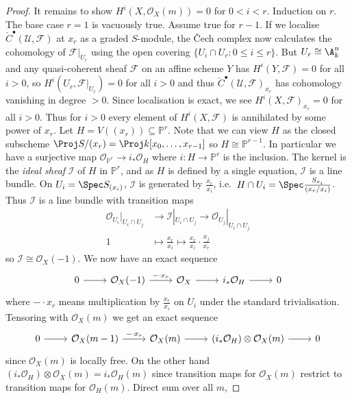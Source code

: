 \documentclass[a4paper]{article}
\renewcommand*{\P}{\mathbb{P}}
\newcommand{\sh}[1]{\mathcal{#1}} %
\begin{document}
\begin{proof}
  It remains to show \(H^i(X, \sh O_X(m)) = 0\) for \(0 < i < r\). Induction on \(r\). The base case \(r = 1\) is vacuously true. Assume true for \(r - 1\). If we localise \(\check C^\bullet(\mathcal U, \sh F)\) at \(x_r\) as a graded \(S\)-module, the Čech complex now calculates the cohomology of \(\sh F|_{U_r}\) using the open covering \(\{U_i \cap U_r: 0 \leq i \leq r\}\). But \(U_r \cong \A^n_k\) and any quasi-coherent sheaf \(\sh F\) on an affine scheme \(Y\) has \(H^i(Y, \sh F) = 0\) for all \(i > 0\), so \(H^i(U_r, \sh F|_{U_r}) = 0\) for all \(i > 0\) and thus \(\check C^\bullet(\mathcal U, \sh F)_{x_r}\) has cohomology vanishing in degree \(> 0\). Since localisation is exact, we see \(H^i(X, \sh F)_{x_r} = 0\) for all \(i > 0\). Thus for \(i > 0\) every element of \(H^i(X, \sh F)\) is annihilated by some power of \(x_r\). Let \(H = V((x_r)) \subseteq \P^r\). Note that we can view \(H\) as the closed subscheme \(\Proj S/(x_r) = \Proj k[x_0, \dots, x_{r - 1}]\) so \(H \cong \P^{r - 1}\). In particular we have a surjective map \(\sh O_{\P^r} \to i_* \sh O_H\) where \(i: H \to \P^r\) is the inclusion. The kernel is the \emph{ideal sheaf} \(\sh I\) of \(H\) in \(\P^r\), and as \(H\) is defined by a single equation, \(\sh I\) is a line bundle. On \(U_i = \Spec S_{(x_i)}\), \(\sh I\) is generated by \(\frac{x_r}{x_i}\), i.e.\ \(H \cap U_i = \Spec \frac{S_{x_i}}{(x_r/x_i)}\). Thus \(\sh I\) is a line bundle with transition maps
  \begin{align*}
    \sh O_{U_i}|_{U_i \cap U_j} &\to \sh I|_{U_i \cap U_j} \to \sh O_{U_j}|_{U_i \cap U_j} \\
    1 &\mapsto \frac{x_r}{x_i} \mapsto \frac{x_r}{x_i} \cdot \frac{x_j}{x_r}
  \end{align*}
  so \(\sh I \cong \sh O_X(-1)\). We now have an exact sequence
  \[
    \begin{tikzcd}
      0 \ar[r] & \sh O_X(-1) \ar[r, "- \cdot x_r"] & \sh O_X \ar[r] & i_* \sh O_H \ar[r] & 0
    \end{tikzcd}
  \]
  where \(- \cdot x_r\) means multiplication by \(\frac{x_r}{x_i}\) on \(U_i\) under the standard trivialisation. Tensoring with \(\sh O_X(m)\) we get an exact sequence
  \[
    \begin{tikzcd}
      0 \ar[r] & \sh O_X(m - 1) \ar[r, "- \cdot x_r"] & \sh O_X(m) \ar[r] & (i_* \sh O_H) \otimes \sh O_X(m) \ar[r] & 0
    \end{tikzcd}
  \]
  since \(\sh O_X(m)\) is locally free. On the other hand \((i_* \sh O_H) \otimes \sh O_X(m) = i_* \sh O_H(m)\) since transition maps for \(\sh O_X(m)\) restrict to transition maps for \(\sh O_H(m)\). Direct sum over all \(m\),

\end{proof}
\end{document}
